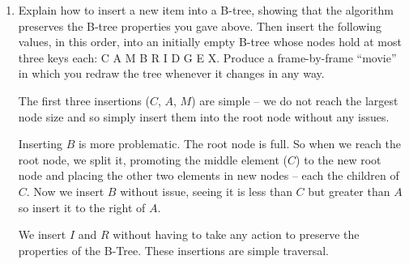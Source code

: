\documentclass[10pt,\jkfside,a4paper]{article}
\begin{document}
\begin{enumerate}
\item Explain how to insert a new item into a B-tree, showing that the algorithm preserves the B-tree 
properties you gave above.
Then insert the following values, in this order, into an initially empty
B-tree whose nodes hold at most three keys each: C A M B R I D G E X. Produce a frame-by-frame ``movie'' 
in which you redraw the tree whenever it changes in any way.

The first three insertions ($C$, $A$, $M$) are simple -- we do not reach the largest node size and so simply insert them 
into the root node without any issues.

\begin{center}
\end{center}

Inserting $B$ is more problematic.
The root node is full.
So when we reach the root node, we split it, promoting
the middle element ($C$) to the new root node and placing the other two elements in new nodes -- each the children 
of $C$.
Now we insert $B$ without issue, seeing it is less than $C$ but greater than $A$ so insert it to the right of $A$.

\begin{center}
\end{center}

We insert $I$ and $R$ without having to take any action to preserve the properties of the B-Tree. These insertions are 
simple traversal.


\end{enumerate}
\end{document}
